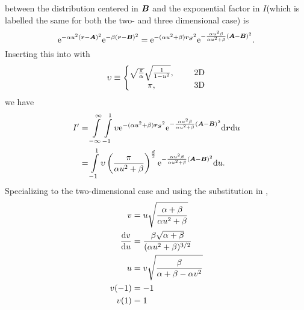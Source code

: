     between the distribution centered in $\boldsymbol{{B}}$ and the exponential factor
    in $I$(which is labelled the same for both the two- and three dimensional
    case) is
        \begin{equation}
            \mathrm{e}^{-\alpha u^2(\boldsymbol{{r}}-\boldsymbol{{A}})^2} \mathrm{e}^{-\beta(\boldsymbol{{r}} -
            \boldsymbol{{B}})^2} = \mathrm{e}^{-(\alpha u^2 + \beta)\boldsymbol{{r_S}}^2}
            \mathrm{e}^{-\frac{\alpha u^2\beta}{\alpha u^2 + \beta}
            (\boldsymbol{{A}}-\boldsymbol{{B}})^2}.
        \end{equation}
    Inserting this into  with 
        \begin{equation}
            \upsilon \equiv \left\{
                \begin{matrix}
                    \sqrt{\frac{\pi}{\alpha}}\sqrt{\frac{1}{1-u^2}},&\indent
                    \text{2D} \\
                    \pi,&\indent \text{3D}
                \end{matrix}\right.
            \label{eq:upsilonDef1}
        \end{equation}
    we have
        \begin{align}
            I' &= \int\limits^{\infty}_{-\infty} \int\limits^1_{-1} \upsilon \mathrm{e}^{-(\alpha u^2 +
            \beta)\boldsymbol{{r_S}}^2} \mathrm{e}^{-\frac{\alpha u^2\beta}{\alpha u^2 +
            \beta} (\boldsymbol{{A}}-\boldsymbol{{B}})^2} \mathrm{d}\boldsymbol{{r}}\mathrm{d} u \nonumber \\
            &= \int\limits^1_{-1} \upsilon \left(\frac{\pi}{\alpha u^2 +
            \beta}\right)^{\frac{d}{2}} \mathrm{e}^{-\frac{\alpha u^2\beta}{\alpha u^2
            + \beta}(\boldsymbol{{A}}-\boldsymbol{{B}})^2} \mathrm{d} u.
        \end{align}
    Specializing to the two-dimensional case and using the substitution in
    ,
        \begin{equation}
            \begin{aligned}
                v &= u\sqrt{\frac{\alpha+\beta}{\alpha u^2 + \beta}} \\
                \frac{\mathrm{d} v}{\mathrm{d} u} &= \frac{\beta\sqrt{\alpha+\beta}}{(\alpha
                u^2 + \beta)^{3/2}} \\
                u &= v \sqrt{\frac{\beta}{\alpha+\beta - \alpha v^2}} \\
                v(-1) &= -1 \\
                v(1) &= 1
            \end{aligned}
            \label{eq:sub2def}
        \end{equation}
